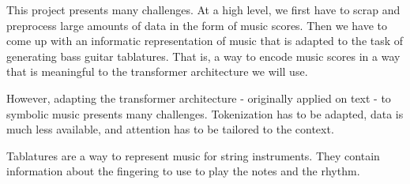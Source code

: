 \documentclass[11pt, a4paper]{article}
\begin{document}
This project presents many challenges. At a high level, we first have to scrap and preprocess large amounts of data in the form of music scores.
Then we have to come up with an informatic representation of music that is adapted to the task of generating bass guitar tablatures.
That is, a way to encode music scores in a way that is meaningful to the transformer architecture we will use.



However, adapting the transformer architecture - originally applied on text - to symbolic music presents many challenges.
Tokenization has to be adapted, data is much less available, and attention has to be tailored to the context\cite{leNaturalLanguageProcessing2024}.



Tablatures are a way to represent music for string instruments. They contain information about the fingering to use to play the notes and the rhythm.








\newpage

\printbibliography%
\end{document}
